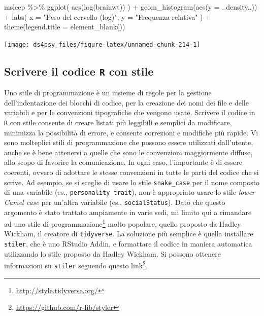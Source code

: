 \documentclass[
  11pt,
]{krantz}
\makeatletter
\newenvironment{Shaded}{\begin{snugshade}}{\end{snugshade}}
\newcommand{\AttributeTok}[1]{\textcolor[rgb]{0.61,0.61,0.61}{#1}}
\newcommand{\FunctionTok}[1]{\textcolor[rgb]{0,0,0}{#1}}
\newcommand{\NormalTok}[1]{#1}
\newcommand{\SpecialCharTok}[1]{\textcolor[rgb]{0,0,0}{#1}}
\newcommand{\StringTok}[1]{\textcolor[rgb]{0.5,0.5,0.5}{#1}}
\renewcommand{\href}[2]{#2\footnote{\url{#1}}}
\newenvironment{kframe}{%
\medskip{}
\setlength{\fboxsep}{.8em}
 \def\at@end@of@kframe{}%
 \ifinner\ifhmode%
  \def\at@end@of@kframe{\end{minipage}}%
  \begin{minipage}{\columnwidth}%
 \fi\fi%
 \def\FrameCommand##1{\hskip\@totalleftmargin \hskip-\fboxsep
 \colorbox{shadecolor}{##1}\hskip-\fboxsep
     \hskip-\linewidth \hskip-\@totalleftmargin \hskip\columnwidth}%
 \MakeFramed {\advance\hsize-\width
   \@totalleftmargin\z@ \linewidth\hsize
   \@setminipage}}%
 {\par\unskip\endMakeFramed%
 \at@end@of@kframe}
\renewenvironment{Shaded}{\begin{kframe}}{\end{kframe}}
\theoremstyle{definition}
\theoremstyle{definition}
\theoremstyle{definition}
\theoremstyle{definition}
\theoremstyle{remark}
\makeatother
\begin{document}
\begin{Shaded}
\begin{Highlighting}[]
\NormalTok{msleep }\SpecialCharTok{\%\textgreater{}\%} 
  \FunctionTok{ggplot}\NormalTok{(}
    \FunctionTok{aes}\NormalTok{(}\FunctionTok{log}\NormalTok{(brainwt))}
\NormalTok{  ) }\SpecialCharTok{+}
  \FunctionTok{geom\_histogram}\NormalTok{(}\FunctionTok{aes}\NormalTok{(}\AttributeTok{y =}\NormalTok{ ..density..)) }\SpecialCharTok{+}
  \FunctionTok{labs}\NormalTok{(}
    \AttributeTok{x =} \StringTok{"Peso del cervello (log)"}\NormalTok{,}
    \AttributeTok{y =} \StringTok{"Frequenza relativa"}
\NormalTok{  ) }\SpecialCharTok{+}
  \FunctionTok{theme}\NormalTok{(}\AttributeTok{legend.title =} \FunctionTok{element\_blank}\NormalTok{())}
\end{Highlighting}
\end{Shaded}

\begin{center}\texttt{[image: ds4psy\_files/figure-latex/unnamed-chunk-214-1]} \end{center}

\hypertarget{scrivere-il-codice-r-con-stile}{%
\subsection{\texorpdfstring{Scrivere il codice \texttt{R} con stile}{Scrivere il codice R con stile}}\label{scrivere-il-codice-r-con-stile}}

Uno stile di programmazione è un insieme di regole per la gestione dell'indentazione dei blocchi di codice, per la creazione dei nomi dei file e delle variabili e per le convenzioni tipografiche che vengono usate. Scrivere il codice in \texttt{R} con stile consente di creare listati più leggibili e semplici da modificare, minimizza la possibilità di errore, e consente correzioni e modifiche più rapide. Vi sono molteplici stili di programmazione che possono essere utilizzati dall'utente, anche se è bene attenersi a quelle che sono le convenzioni maggiormente diffuse, allo scopo di favorire la comunicazione. In ogni caso, l'importante è di essere coerenti, ovvero di adottare le stesse convenzioni in tutte le parti del codice che si scrive. Ad esempio, se si sceglie di usare lo stile \texttt{snake\_case} per il nome composto di una variabile (es., \texttt{personality\_trait}), non è appropriato usare lo stile \emph{lower Camel case} per un'altra variabile (es., \texttt{socialStatus}). Dato che questo argomento è stato trattato ampiamente in varie sedi, mi limito qui a rimandare ad uno \href{http://style.tidyverse.org/}{stile di programmazione} molto popolare, quello proposto da Hadley Wickham, il creatore di \texttt{tidyverse}. La soluzione più semplice è quella installare \texttt{stiler}, che è uno RStudio Addin, e formattare il codice in maniera automatica utilizzando lo stile proposto da Hadley Wickham. Si possono ottenere informazioni su \texttt{stiler} seguendo questo \href{https://github.com/r-lib/styler}{link}.
\end{document}
